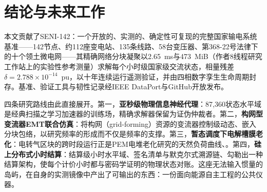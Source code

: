 \section{结论与未来工作}
\label{sec:conclusion}

本文贡献了SENI-142：一个开放的、实测的、确定性可复现的完整国家输电系统基准——142节点、约112座变电站、135条线路、58台变压器、第368-22号法律下的十个领土微电网——其精确网络分块凝聚以2.65~ms与473~MiB（作者8线程研究工作站上的实验性参考测量）求解每个小时级国家级交流状态，相量残差 $\delta = 2.788 \times 10^{-14}$~pu，以十年连续运行遥测验证，并由四相数字孪生生命周期封存。基准、验证工具与韧性记录经IEEE DataPort与GitHub开放发布。

四条研究路线由此直接展开。第一，\textbf{亚秒级物理信息神经代理}：87,360状态水平域是经典扫描之学习加速器的训练场，精确求解器保留为证伪仲裁者\cite{misyris2020}。第二，\textbf{构网型变流器EMT联合仿真}：将构网（grid-forming）资源的变流器控制级动态\cite{rosso2021}、\cite{ieee2800}嵌入分块包络，以研究频率的形成而不仅是频率的支撑。第三，\textbf{暂态调度下电解槽膜老化}：电转气区块的跨时段运行正是PEM电堆老化研究的天然负荷曲线\cite{irena2020}、\cite{iea2023}。第四，\textbf{硅上分布式小时结算}：结算级小时水平域、签名清单与默克尔式溯源链\cite{merkle1987}、\cite{fips180}勾勒出一种结算架构，使每个计价小时都与密码学证明的物理状态对账。这座无法输入惯量的岛屿，在自身的实测镜像中产出了可输出的东西：一份面向能源自主工程的公共仪器。

